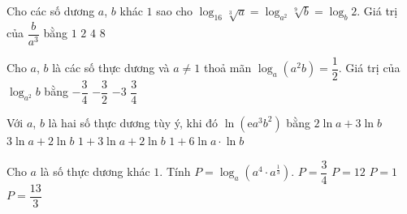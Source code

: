 \begin{ex}%
	Cho các số dương $a$, $b$ khác $ 1$ sao cho $\log_{16}\sqrt[3]{a}=\log_{a^2}\sqrt[9]{b}=\log_b2$. Giá trị  của $\dfrac{b}{a^3}$ bằng
	\choice 
		{\True $1$} 
		 {$2$}
		{$4$} 
		{$8$} 
\end{ex}

\begin{ex}%
	Cho $a$,  $b$ là các số thực dương và $a\ne 1$ thoả mãn $\log_a\left(a^2b\right)=\dfrac{1}{2}$. Giá trị của $\log_{a^2}b$ bằng
	 \choice
		{\True  $-\dfrac{3}{4}$}
		 {$-\dfrac{3}{2}$}
		{$-3$} 
		{$\dfrac{3}{4}$} 
\end{ex}

\begin{ex}%
	Với $a$, $b$ là hai số thực dương tùy ý, khi đó $\ln (\mathrm{e}a^3b^2)$ bằng 
	 \choice
		{$2\ln a+3\ln  b$}
		{$3\ln a+2\ln  b$}
		{\True $1+3\ln a+2\ln b$} 
		 {$1+6\ln a\cdot \ln b$}
\end{ex}

\begin{ex}%
	Cho $a$ là số thực dương khác  $1$. Tính $P=\log_a\left(a^4\cdot a^{\tfrac{1}{3}}\right)$.
	\choice 
		{$P=\dfrac{3}{4}$} 
		 {$P=12$}
		{$P=1$} 
		{\True $P=\dfrac{13}{3}$} 
\end{ex}

